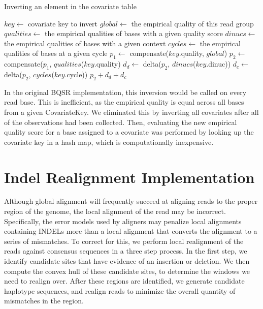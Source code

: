 \documentclass[phd]{ucbthesis}
\begin{document}
\begin{algorithm}
\caption{Inverting an element in the covariate table}
\label{alg:invert-cov}
\begin{algorithmic}
\STATE $key \leftarrow$ covariate key to invert
\STATE $global \leftarrow$ the empirical quality of this read group
\STATE $qualities \leftarrow$ the empirical qualities of bases with a given quality score
\STATE $dinucs \leftarrow$ the empirical qualities of bases with a given context
\STATE $cycles \leftarrow$ the empirical qualities of bases at a given cycle
\STATE $p_1 \leftarrow$ compensate($key$.quality, $global$)
\STATE $p_2 \leftarrow$ compensate($p_1$, $qualities$($key$.quality)
\STATE $d_d \leftarrow$ delta($p_2$, $dinucs$($key$.dinuc))
\STATE $d_c \leftarrow$ delta($p_2$, $cycles$($key$.cycle))
\RETURN $p_2 + d_d + d_c$
\end{algorithmic}
\end{algorithm}

In the original BQSR implementation, this inversion would be called on every
read base. This is inefficient, as the empirical quality is equal across all
bases from a given {CovariateKey}. We eliminated this by inverting all
covariates after all of the observations had been collected. Then, evaluating
the new empirical quality score for a base assigned to a covariate was performed
by looking up the covariate key in a hash map, which is computationally
inexpensive.

\section{Indel Realignment Implementation}
\label{sec:indel-realignment-implementation}

Although global alignment will frequently succeed at aligning reads to the proper region of the genome, the local
alignment of the read may be incorrect. Specifically, the error models used by aligners may penalize local alignments
containing INDELs more than a local alignment that converts the alignment to a series of mismatches. To correct
for this, we perform local realignment of the reads against consensus sequences in a three step
process. In the first step, we identify candidate sites that have evidence of an insertion or deletion. We then compute
the convex hull of these candidate sites, to determine the windows we need to realign over. After these regions are
identified, we generate candidate haplotype sequences, and realign reads to minimize the overall quantity of mismatches
in the region.
\end{document}
